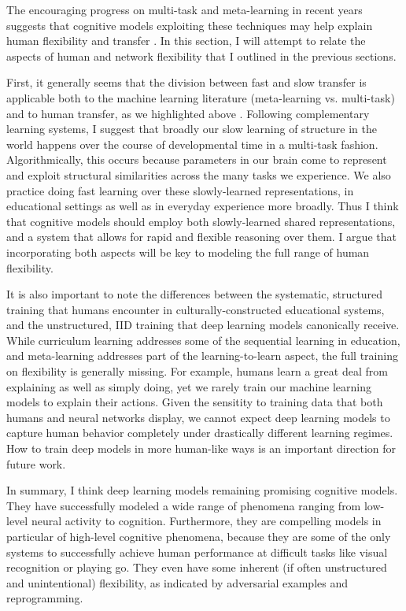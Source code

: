 The encouraging progress on multi-task and meta-learning in recent years suggests that cognitive models exploiting these techniques may help explain human flexibility and transfer \citep{Hansen2017}. In this section, I will attempt to relate the aspects of human and network flexibility that I outlined in the previous sections. \par 
First, it generally seems that the division between fast and slow transfer is applicable both to the machine learning literature (meta-learning vs. multi-task) and to human transfer, as we highlighted above \citep[and in prior work, namely][]{Lampinen2017a}. Following complementary learning systems, I suggest that broadly our slow learning of structure in the world happens over the course of developmental time in a multi-task fashion. Algorithmically, this occurs because parameters in our brain come to represent and exploit structural similarities across the many tasks we experience. We also practice doing fast learning over these slowly-learned representations, in educational settings as well as in everyday experience more broadly. Thus I think that cognitive models should employ both slowly-learned shared representations, and a system that allows for rapid and flexible reasoning over them. I argue that incorporating both aspects will be key to modeling the full range of human flexibility. \par 
It is also important to note the differences between the systematic, structured training that humans encounter in culturally-constructed educational systems, and the unstructured, IID training that deep learning models canonically receive. While curriculum learning addresses some of the sequential learning in education, and meta-learning addresses part of the learning-to-learn aspect, the full training on flexibility is generally missing. For example, humans learn a great deal from explaining as well as simply doing, yet we rarely train our machine learning models to explain their actions. Given the sensitity to training data that both humans and neural networks display, we cannot expect deep learning models to capture human behavior completely under drastically different learning regimes. How to train deep models in more human-like ways is an important direction for future work.  \par
In summary, I think deep learning models remaining promising cognitive models. They have successfully modeled a wide range of phenomena ranging from low-level neural activity to cognition. Furthermore, they are compelling models in particular of high-level cognitive phenomena, because they are some of the only systems to successfully achieve human performance at difficult tasks like visual recognition or playing go. They even have some inherent (if often unstructured and unintentional) flexibility, as indicated by adversarial examples and reprogramming. \par
